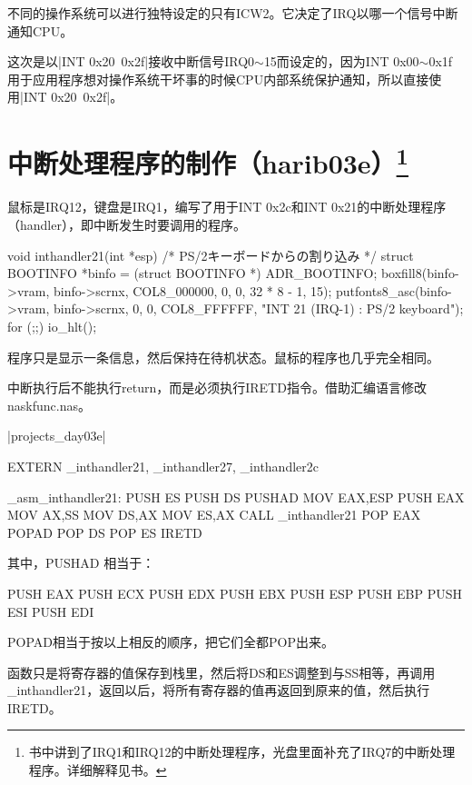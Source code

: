 不同的操作系统可以进行独特设定的只有ICW2。它决定了IRQ以哪一个信号中断通知CPU。

这次是以|INT 0x20~0x2f|接收中断信号IRQ0$\sim$15而设定的，因为INT 0x00$\sim$0x1f用于应用程序想对操作系统干坏事的时候CPU内部系统保护通知，所以直接使用|INT 0x20~0x2f|。

\section[中断处理程序的制作（harib03e）]{中断处理程序的制作（harib03e）\protect\footnote{书中讲到了IRQ1和IRQ12的中断处理程序，光盘里面补充了IRQ7的中断处理程序。详细解释见书。}}
鼠标是IRQ12，键盘是IRQ1，编写了用于INT 0x2c和INT 0x21的中断处理程序（handler），即中断发生时要调用的程序。

\begin{code}[label=int.c节选]
void inthandler21(int *esp)
/* PS/2キーボードからの割り込み */
{
	struct BOOTINFO *binfo = (struct BOOTINFO *) ADR_BOOTINFO;
	boxfill8(binfo->vram, binfo->scrnx, COL8_000000, 0, 0, 32 * 8 - 1, 15);
	putfonts8_asc(binfo->vram, binfo->scrnx, 0, 0, COL8_FFFFFF, "INT 21 (IRQ-1) : PS/2 keyboard");
	for (;;) {
		io_hlt();
	}
}
\end{code}

程序只是显示一条信息，然后保持在待机状态。鼠标的程序也几乎完全相同。

\cs


中断执行后不能执行return，而是必须执行IRETD指令。借助汇编语言修改naskfunc.nas。

\dag|projects_day\harib03e|
\begin{code}[label=naskfunc.nas节选]
		EXTERN	_inthandler21, _inthandler27, _inthandler2c

_asm_inthandler21:
		PUSH	ES
		PUSH	DS
		PUSHAD
		MOV		EAX,ESP
		PUSH	EAX
		MOV		AX,SS
		MOV		DS,AX
		MOV		ES,AX
		CALL	_inthandler21
		POP		EAX
		POPAD
		POP		DS
		POP		ES
		IRETD
\end{code}

其中，PUSHAD 相当于：
\begin{code}
PUSH EAX
PUSH ECX
PUSH EDX
PUSH EBX
PUSH ESP
PUSH EBP
PUSH ESI
PUSH EDI
\end{code}

POPAD相当于按以上相反的顺序，把它们全都POP出来。

\cs

函数只是将寄存器的值保存到栈里，然后将DS和ES调整到与SS相等，再调用\_inthandler21，返回以后，将所有寄存器的值再返回到原来的值，然后执行IRETD。

